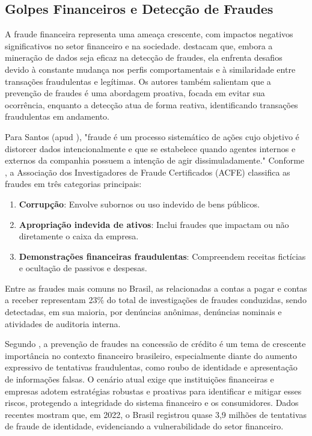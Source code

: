 \documentclass[12pt,a4paper]{article}
\begin{document}
\subsection{Golpes Financeiros e Detecção de Fraudes}

A fraude financeira representa uma ameaça crescente, com impactos negativos significativos no setor financeiro e na sociedade. \cite{martins2022} destacam que, embora a mineração de dados seja eficaz na detecção de fraudes, ela enfrenta desafios devido à constante mudança nos perfis comportamentais e à similaridade entre transações fraudulentas e legítimas. Os autores também salientam que a prevenção de fraudes é uma abordagem proativa, focada em evitar sua ocorrência, enquanto a detecção atua de forma reativa, identificando transações fraudulentas em andamento.

Para Santos (apud \cite{soares2024}), "fraude é um processo sistemático de ações cujo objetivo é distorcer dados intencionalmente e que se estabelece quando agentes internos e externos da companhia possuem a intenção de agir dissimuladamente." Conforme \cite{soares2024}, a Associação dos Investigadores de Fraude Certificados (ACFE) classifica as fraudes em três categorias principais:
\begin{enumerate}
    \item \textbf{Corrupção}: Envolve subornos ou uso indevido de bens públicos.
    \item \textbf{Apropriação indevida de ativos}: Inclui fraudes que impactam ou não diretamente o caixa da empresa.
    \item \textbf{Demonstrações financeiras fraudulentas}: Compreendem receitas fictícias e ocultação de passivos e despesas.
\end{enumerate}

Entre as fraudes mais comuns no Brasil, as relacionadas a contas a pagar e contas a receber representam 23\% do total de investigações de fraudes conduzidas, sendo detectadas, em sua maioria, por denúncias anônimas, denúncias nominais e atividades de auditoria interna.

Segundo \cite{thinkdata2024}, a prevenção de fraudes na concessão de crédito é um tema de crescente importância no contexto financeiro brasileiro, especialmente diante do aumento expressivo de tentativas fraudulentas, como roubo de identidade e apresentação de informações falsas. O cenário atual exige que instituições financeiras e empresas adotem estratégias robustas e proativas para identificar e mitigar esses riscos, protegendo a integridade do sistema financeiro e os consumidores. Dados recentes mostram que, em 2022, o Brasil registrou quase 3,9 milhões de tentativas de fraude de identidade, evidenciando a vulnerabilidade do setor financeiro.
\end{document}
